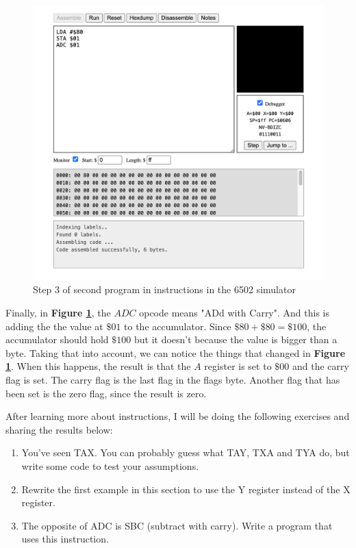\documentclass[a4paper]{article}
\begin{document}
\begin{figure}[H]
    \centering
    \includegraphics[width=1.0\textwidth]{res/images/q2/16-instructions-second-step3.png}
    \caption{Step 3 of second program in instructions in the 6502 simulator}
    \label{fig:16-instructions-second-step3}
\end{figure}

Finally, in \textbf{Figure \ref{fig:16-instructions-second-step3}}, the $ADC$ opcode means "ADd with Carry". And this is adding the the value at $\$01$ to the accumulator. Since $\$80 + \$80 = \$100$, the accumulator should hold $\$100$ but it doesn't because the value is bigger than a byte. Taking that into account, we can notice the things that changed in \textbf{Figure \ref{fig:16-instructions-second-step3}}. When this happens, the result is that the $A$ register is set to $\$00$ and the carry flag is set. The carry flag is the last flag in the flags byte. Another flag that has been set is the zero flag, since the result is zero.


After learning more about instructions, I will be doing the following exercises and sharing the results below:
\begin{enumerate}
    \item You've seen TAX. You can probably guess what TAY, TXA and TYA do, but write some code to test your assumptions.
    \item Rewrite the first example in this section to use the Y register instead of the X register.
    \item The opposite of ADC is SBC (subtract with carry). Write a program that uses this instruction.
\end{enumerate}
\end{document}
